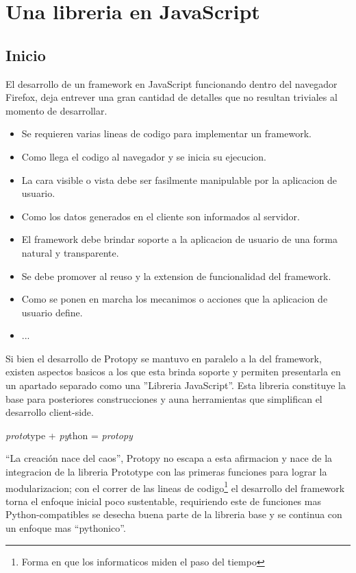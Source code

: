 \chapter{Una libreria en JavaScript}

\section{Inicio}
El desarrollo de un framework en JavaScript funcionando dentro del navegador
Firefox, deja entrever una gran cantidad de detalles que no resultan triviales
al momento de desarrollar.
\begin{itemize}
 \item Se requieren varias lineas de codigo para implementar un framework.
 \item Como llega el codigo al navegador y se inicia su ejecucion.
 \item La cara visible o vista debe ser fasilmente manipulable por la aplicacion
de usuario.
 \item Como los datos generados en el cliente son informados al servidor.
 \item El framework debe brindar soporte a la aplicacion de usuario de una forma
natural y transparente.
 \item Se debe promover al reuso y la extension de funcionalidad del framework.
 \item Como se ponen en marcha los mecanimos o acciones que la aplicacion de
usuario define.
 \item ...
\end{itemize} 
Si bien el desarrollo de Protopy se mantuvo en paralelo a la del
framework, existen aspectos basicos a los que esta brinda soporte y permiten
presentarla en un apartado separado como una ''Libreria JavaScript''. Esta
libreria constituye la base para posteriores construcciones y auna
herramientas que simplifican el desarrollo client-side.

\textit{proto}type + \textit{py}thon = \textit{protopy}

``La creación nace del caos'', Protopy no escapa a esta afirmacion y nace de la
integracion de la libreria Prototype con las primeras funciones para lograr
la modularizacion; con el correr de las lineas de codigo\footnote{Forma en que
los informaticos miden el paso del tiempo} el desarrollo del framework torna
el enfoque inicial poco sustentable, requiriendo este de funciones mas
Python-compatibles se desecha buena parte de la libreria base y se continua con
un enfoque mas ``pythonico''.

